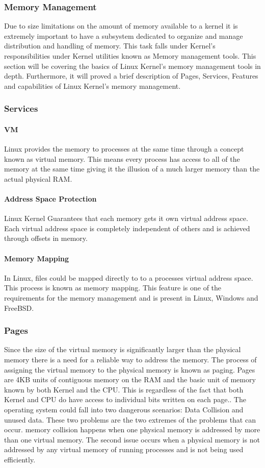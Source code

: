\documentclass[journal,10pt,onecolumn,compsoc,letterpaper,draftclsnofoot,table,xcdraw]{IEEEtran} \usepackage[margin=0.75in]{geometry}
\begin{document}
\subsubsection{Memory Management}
\noindent Due to size limitations on the amount of memory available to a kernel it is extremely important to have a subsystem dedicated to organize and manage distribution and handling of memory. This task falls under Kernel's responsibilities under Kernel utilities known as Memory management tools. This section will be covering the basics of Linux Kernel's memory management tools in depth. Furthermore, it will proved a brief description of Pages, Services, Features and capabilities of Linux Kernel's memory management.
\subsubsection{Services}
\paragraph{VM} Linux provides the memory to processes at the same time through a concept known as virtual memory. This means every process has access to all of the memory at the same time giving it the illusion of a much larger memory than the actual physical RAM.\cite{2-1}
\paragraph{Address Space Protection}Linux Kernel Guarantees that each memory gets it own virtual address space. Each virtual address space is completely independent of others and is achieved through offsets in memory.\cite{2-1}
\paragraph{Memory Mapping} In Linux, files could be mapped directly to to a processes virtual address space. This process is known as memory mapping. This feature is one of the requirements for the memory management and is present in Linux, Windows and FreeBSD.\cite{2-1}
\subsubsection{Pages} Since the size of the virtual memory is significantly larger than the physical memory there is a need for a reliable way to address the memory. The process of assigning the virtual memory to the physical memory is known as paging. Pages are 4KB units of contiguous memory on the RAM and the basic unit of memory known by both Kernel and the CPU. This is regardless of the fact that both Kernel and CPU do have access to individual bits written on each page.\cite{2-2}. The operating system could fall into two dangerous scenarios: Data Collision and unused data. These two problems are the two extremes of the problems that can occur. memory collision happens when one physical memory is addressed by more than one virtual memory. The second issue occurs when a physical memory is not addressed by any virtual memory of running processes and is not being used efficiently.\cite{2-1}
\end{document}

